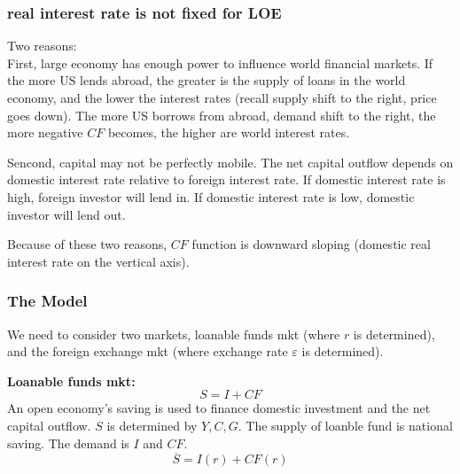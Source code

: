\documentclass[12pt]{article}
\begin{document}
\begin{figure}[H]
\end{figure}



\subsubsection{real interest rate is not fixed for LOE}
Two reasons:\\
First, large economy has enough power to influence world financial markets.
If the more US lends abroad, the greater is the supply of loans in the world economy,
and the lower the interest rates (recall supply shift to the right, price goes down).
The more US borrows from abroad, demand shift to the right, the more negative $ CF $
becomes, the higher are world interest rates.


Sencond, capital may not be perfectly mobile. The net capital outflow depends on 
domestic interest rate relative to foreign interest rate. 
If domestic interest rate is high, foreign investor will lend in. If domestic
interest rate is low, domestic investor will lend out.


Because of these two reasons, $ CF $ function is downward sloping (domestic real
interest rate on the vertical axis).



\subsubsection{The Model}
We need to consider two markets, loanable funds mkt (where $ r $ is determined), and
the foreign exchange mkt (where exchange rate $ \varepsilon $ is determined).

{\textbf {Loanable funds mkt:}}\\
\begin{equation*}
S = I + CF
\end{equation*}
An open economy's saving is used to finance domestic investment and the net capital
outflow. $ S $ is determined by $ Y, C, G $. The supply of loanble fund is national
saving. The demand is $ I $ and $ CF $.
\begin{equation*}
 \overline{S} = I(r) + CF(r)
\end{equation*}
\end{document}
